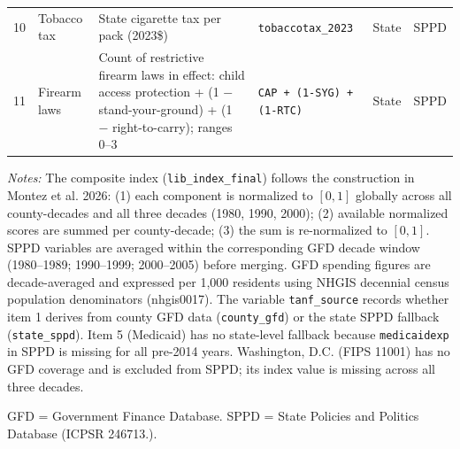 \begin{table}[ht]
\begin{threeparttable}
\begin{tabular}{clp{4.6cm}p{2.6cm}lp{1.6cm}}
10 & Tobacco tax           & State cigarette tax per pack (2023\$) & \texttt{tobaccotax\_2023}     & State & SPPD \\[4pt]
11 & Firearm laws          & Count of restrictive firearm laws in effect: child access protection + (1 $-$ stand-your-ground) + (1 $-$ right-to-carry); ranges 0--3 & \texttt{CAP + (1-SYG) + (1-RTC)} & State & SPPD \\
\bottomrule
\end{tabular}
\begin{tablenotes}
\footnotesize
\item \textit{Notes:} The composite index (\texttt{lib\_index\_final}) follows the construction in Montez et al. 2026: (1) each component is normalized to $[0,1]$ globally across all county-decades and all three decades (1980, 1990, 2000); (2) available normalized scores are summed per county-decade; (3) the sum is re-normalized to $[0,1]$. SPPD variables are averaged within the corresponding GFD decade window (1980--1989; 1990--1999; 2000--2005) before merging. GFD spending figures are decade-averaged and expressed per 1,000 residents using NHGIS decennial census population denominators (nhgis0017). The variable \texttt{tanf\_source} records whether item 1 derives from county GFD data (\texttt{county\_gfd}) or the state SPPD fallback (\texttt{state\_sppd}). Item 5 (Medicaid) has no state-level fallback because \texttt{medicaidexp} in SPPD is missing for all pre-2014 years. Washington, D.C. (FIPS 11001) has no GFD coverage and is excluded from SPPD; its index value is missing across all three decades.
\item GFD = Government Finance Database. SPPD = State Policies and Politics Database (ICPSR 246713.).
\end{tablenotes}
\end{threeparttable}
\end{table}
